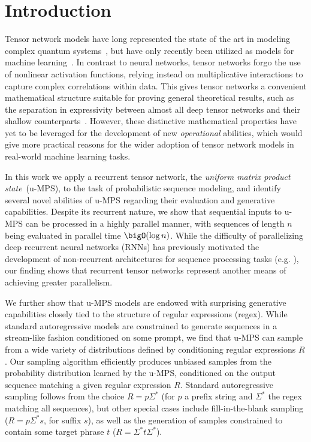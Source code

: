 \section{Introduction}
\label{sec:intro}

Tensor network models have long represented the state of the art in modeling complex quantum systems~\citep{white1992, fannes1992, orus2019}, but have only recently been utilized as models for machine learning~\citep{novikov2015, cohen2016, stoudenmire2016, novikov2017, han2018, stoudenmire2018, cheng2019}. In contrast to neural networks, tensor networks forgo the use of nonlinear activation functions, relying instead on multiplicative interactions to capture complex correlations within data. This gives tensor networks a convenient mathematical structure suitable for proving general theoretical results, such as the separation in expressivity between almost all deep tensor networks and their shallow counterparts~\citep{cohen2016}. However, these distinctive mathematical properties have yet to be leveraged for the development of new \emph{operational} abilities, which would 
give more practical reasons for the wider adoption of tensor network models in real-world machine learning tasks.
 
In this work we apply a recurrent tensor network, the \emph{uniform matrix product state}~(u-MPS), to the task of probabilistic sequence modeling, and identify several novel abilities of u-MPS regarding their evaluation and generative capabilities. Despite its recurrent nature, we show that sequential inputs to u-MPS can be processed in a highly parallel manner, with sequences of length $n$ being evaluated in parallel time $\bigO(\log n)$. While the difficulty of parallelizing deep recurrent neural networks (RNNs) has previously motivated the development of non-recurrent architectures for sequence processing tasks (e.g. \citep{gehring2017, vaswani2017}), our finding shows that recurrent tensor networks represent another means of achieving greater parallelism.

We further show that u-MPS models are endowed with surprising generative capabilities closely tied to the structure of regular expressions (regex). While standard autoregressive models are constrained to generate sequences in a stream-like fashion conditioned on some prompt, we find that u-MPS can sample from a wide variety of distributions defined by conditioning regular expressions $R$. Our sampling algorithm efficiently produces unbiased samples from the probability distribution learned by the u-MPS, conditioned on the output sequence matching a given regular expression $R$. Standard autoregressive sampling follows from the choice $R = p\Sigma^*$ (for $p$ a prefix string and $\Sigma^*$ the regex matching all sequences), but other special cases include fill-in-the-blank sampling ($R = p\Sigma^*s$, for suffix $s$), as well as the generation of samples constrained to contain some target phrase $t$ ($R=\Sigma^*t\Sigma^*$).

